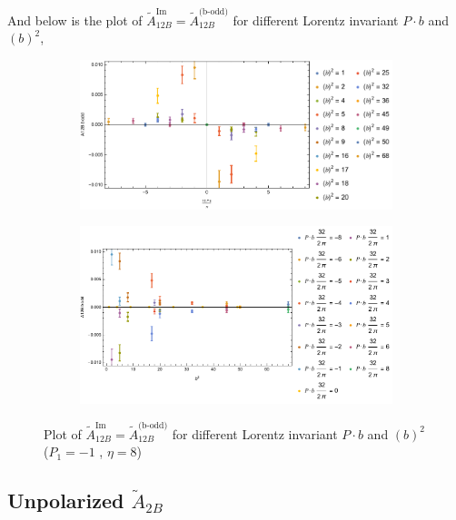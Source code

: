 \documentclass[]{article}
\numberwithin{equation}{section}
\newcommand{\tAmp}{\widetilde{A}}
\newcommand{\tAmp}{\ensuremath{\widetilde{A}^{(+)}}}
\begin{document}
And below is the plot of $\tAmp^{\text{Im}}_{12B}=\tAmp^{\text{(b-odd)}}_{12B}$ for different Lorentz invariant $P\cdot b$ and $(b)^2$,
\begin{figure}[h!]
     \centering
     \begin{subfigure}[b]{0.45\textwidth}
         \centering
         \includegraphics[width=\textwidth]{bP_A12B_b_odd_P1_-1_eta_8.pdf}
     \end{subfigure}
     \begin{subfigure}[b]{0.45\textwidth}
         \centering
         \includegraphics[width=\textwidth]{bsq_A12B_b_odd_P1_-1_eta_8.pdf}
     \end{subfigure}
        \caption{Plot of $\tAmp^{\text{Im}}_{12B}=\tAmp^{\text{(b-odd)}}_{12B}$ for different Lorentz invariant $P\cdot b$ and $(b)^2$  ($P_{1} = -1$ , $\eta=8$)}
\end{figure}



\subsection{Unpolarized $\tAmp_{2B}$}
\end{document}
